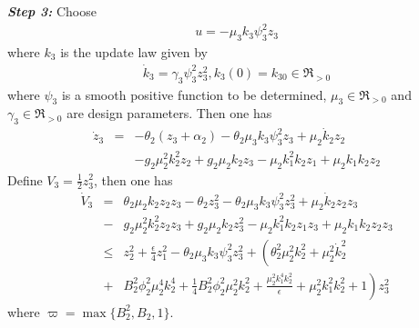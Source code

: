\documentclass{tSYS2e}
\theoremstyle{plain}
\theoremstyle{definition}
\begin{document}
\textbf{\emph{Step 3:}} Choose
\begin{eqnarray}
u=-\mu _{3}k_{3}\psi_3^2z_{3}
\end{eqnarray}
where $k_{3}$ is the update law given by
\begin{eqnarray}
\dot{k}_{3} =\gamma _{3}\psi_3^2z_{3}^{2}, k_{3}(0)=k_{30}\in \Re _{>0}
\end{eqnarray}
where $\psi_3$ is a smooth positive function to be determined, $\mu _{3}\in \Re _{>0}$ and $\gamma _{3}\in \Re _{>0}$ are design parameters. Then one has
\begin{eqnarray*}
\dot{z}_{3}&=&-\theta_2(z_3+\alpha_2)-\theta_2\mu _{3}k_{3}\psi_3^2z_{3}+\mu _{2}\dot{k}_{2}z_{2}\nonumber\\
&&-g_{2}\mu _{2}^2k_{2}^2z_{2}+g_{2}\mu _{2}k_{2}z_3-\mu _{2}k_1^2 k_{2}z_1+\mu _{2}k_1k_{2}z_{2}
\end{eqnarray*}
Define $V_{3}=\frac{1}{2}z_3^2$, then one has
\begin{eqnarray*}
\dot{V}_{3} &=&\theta _{2}\mu _{2}k_{2}z_{2}z_{3}-\theta
_{2}z_{3}^{2}-\theta _{2}\mu _{3}k_{3}\psi _{3}^{2}z_{3}^{2}+\mu _{2}\dot{k}
_{2}z_{2}z_{3}  \nonumber \\
&-&g_{2}\mu _{2}^{2}k_{2}^{2}z_{2}z_{3}+g_{2}\mu _{2}k_{2}z_{3}^{2}-\mu
_{2}k_{1}^{2}k_{2}z_{1}z_{3}+\mu _{2}k_{1}k_{2}z_{2}z_{3}  \nonumber \\
&\leq &z_{2}^{2}+\frac{\epsilon }{4}z_{1}^{2}-\theta _{2}\mu _{3}k_{3}\psi
_{3}^{2}z_{3}^{2}+\left( \theta _{2}^{2}\mu _{2}^{2}k_{2}^{2}+\mu _{2}^{2}
\dot{k}_{2}^{2}\right.   \nonumber \\
&+&\left.B_{2}^{2}\phi _{2}^{2}\mu _{2}^{4}k_{2}^{4}+\frac{1}{4}
B_{2}^{2}\phi _{2}^{2}\mu _{2}^{2}k_{2}^{2}+\frac{\mu
_{2}^{2}k_{1}^{4}k_{2}^{2}}{\epsilon }+\mu_{2}^{2}k_{1}^{2}k_{2}^{2}+1\right) z_{3}^{2}  \nonumber
\end{eqnarray*}
where $\varpi =\max \{B_{2}^{2},B_{2},1\}$.
\end{document}
